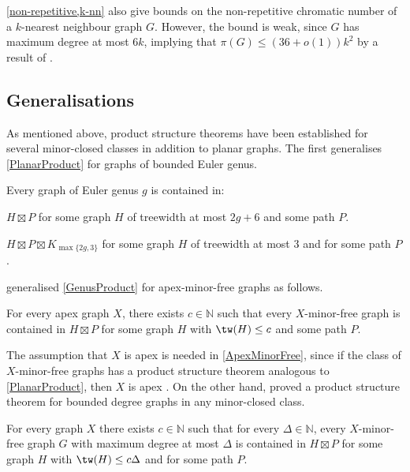   \cref{non-repetitive,k-nn} also give bounds on the non-repetitive chromatic number of a $k$-nearest neighbour graph $G$. However, the bound is weak, since $G$ has maximum degree at most $6k$, implying that $\pi(G) \leq (36+o(1))k^2$ by a result of \citet{DJKW16}.




 \subsection{Generalisations}
 \label{Generalisations}

  As mentioned above, product structure theorems have been established for several minor-closed classes in addition to planar graphs. The first generalises \cref{PlanarProduct} for graphs of bounded Euler genus.
 
  \begin{thm}
  \label{GenusProduct}
  Every graph of Euler genus $g$ is contained in:
  \begin{compactenum}[(a)]
  \item $H  \boxtimes P$ for some graph $H$ of treewidth at most $2g+6$  and some path $P$.
  \item $H \boxtimes P \boxtimes K_{\max\{2g,3\}}$ for some graph $H$ of treewidth at most $3$ and for some path $P$.
  \end{compactenum}
  \end{thm}

 \citet{DJMMUW20} generalised \cref{GenusProduct} for apex-minor-free graphs as follows.

 \begin{thm}
 \label{ApexMinorFree}
 For every apex graph $X$, there exists $c\in\mathbb{N}$ such that every $X$-minor-free graph is contained in $H\boxtimes P$ for some graph $H$ with $\tw(H)\leq c$ and some path $P$.
 \end{thm}

 The assumption that $X$ is apex is needed in \cref{ApexMinorFree}, since if the class of $X$-minor-free graphs has a product structure theorem analogous to \cref{PlanarProduct}, then $X$ is apex \citep{DJMMUW20}. On the other hand, \citet{DEMWW22} proved a product structure theorem for bounded degree graphs in any minor-closed class.

 \begin{thm}
 	\label{MinorFreeDegree}
 	For every graph $X$ there exists $c\in\mathbb{N}$ such that for every $\Delta\in\mathbb{N}$, every $X$-minor-free graph $G$ with maximum degree at most $\Delta$ is contained in $H\boxtimes P$ for some graph $H$ with $\tw(H) \leq c\Delta$ and for some path $P$.
 \end{thm}

